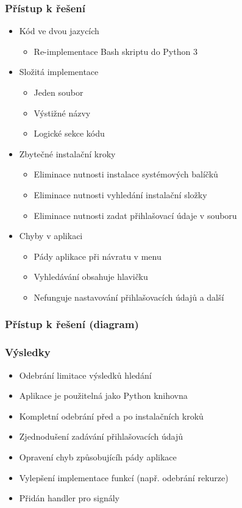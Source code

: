 \documentclass[%
  12pt,       				%
	t,                  %
	aspectratio=1610,   %
	unicode,						%
]{beamer}				    	%
\begin{document}
\begin{frame} 
\frametitle{Přístup k řešení}
\begin{itemize}
	\item Kód ve dvou jazycích
		\begin{itemize}
			\item Re-implementace Bash skriptu do Python 3
		\end{itemize}
	\item Složitá implementace
		\begin{itemize}
			\item Jeden soubor
			\item Výstižné názvy
			\item Logické sekce kódu
		\end{itemize}
	\item Zbytečné instalační kroky
		\begin{itemize}
			\item Eliminace nutnosti instalace systémových balíčků
			\item Eliminace nutnosti vyhledání instalační složky
			\item Eliminace nutnosti zadat přihlašovací údaje v souboru
		\end{itemize}
	\item Chyby v aplikaci
		\begin{itemize}
			\item Pády aplikace při návratu v menu
			\item Vyhledávání obsahuje hlavičku
			\item Nefunguje nastavování přihlašovacích údajů a další
		\end{itemize}
\end{itemize}
\end{frame} 

\begin{frame} 
\frametitle{Přístup k řešení (diagram)}
\end{frame}

\begin{frame} 
\frametitle{Výsledky}
\begin{itemize}
	\item Odebrání limitace výsledků hledání
	\item Aplikace je použitelná jako Python knihovna
	\item Kompletní odebrání před a po instalačních kroků
	\item Zjednodušení zadávání přihlašovacích údajů
	\item Opravení chyb způsobujícíh pády aplikace
	\item Vylepšení implementace funkcí (např. odebrání rekurze)
	\item Přidán handler pro signály
\end{itemize}
\end{frame} 
\end{document}
